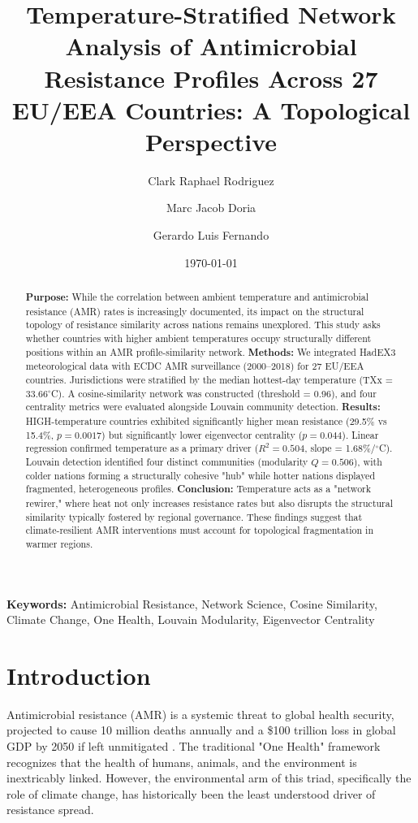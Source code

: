 \documentclass[11pt,a4paper]{article}
\title{\textbf{Temperature-Stratified Network Analysis of Antimicrobial Resistance Profiles Across 27 EU/EEA Countries: A Topological Perspective}}
\author[1]{Clark Raphael Rodriguez}
\author[1]{Marc Jacob Doria}
\author[1]{Gerardo Luis Fernando}
\affil[1]{Department of Physical Sciences and Mathematics, University of the Philippines-Manila, Manila, Philippines}
\date{\today}
\begin{document}
\maketitle

\begin{abstract}
\textbf{Purpose:} While the correlation between ambient temperature and antimicrobial resistance (AMR) rates is increasingly documented, its impact on the structural topology of resistance similarity across nations remains unexplored. This study asks whether countries with higher ambient temperatures occupy structurally different positions within an AMR profile-similarity network.
\textbf{Methods:} We integrated HadEX3 meteorological data with ECDC AMR surveillance (2000–2018) for 27 EU/EEA countries. Jurisdictions were stratified by the median hottest-day temperature (TXx = 33.66$^\circ$C). A cosine-similarity network was constructed (threshold = 0.96), and four centrality metrics were evaluated alongside Louvain community detection.
\textbf{Results:} HIGH-temperature countries exhibited significantly higher mean resistance (29.5\% vs 15.4\%, $p=0.0017$) but significantly lower eigenvector centrality ($p=0.044$). Linear regression confirmed temperature as a primary driver ($R^2 = 0.504$, slope = 1.68\%/$^\circ$C). Louvain detection identified four distinct communities (modularity $Q=0.506$), with colder nations forming a structurally cohesive "hub" while hotter nations displayed fragmented, heterogeneous profiles.
\textbf{Conclusion:} Temperature acts as a "network rewirer," where heat not only increases resistance rates but also disrupts the structural similarity typically fostered by regional governance. These findings suggest that climate-resilient AMR interventions must account for topological fragmentation in warmer regions.
\end{abstract}

\textbf{Keywords:} Antimicrobial Resistance, Network Science, Cosine Similarity, Climate Change, One Health, Louvain Modularity, Eigenvector Centrality

\section{Introduction}\label{intro}
Antimicrobial resistance (AMR) is a systemic threat to global health security, projected to cause 10 million deaths annually and a \$100 trillion loss in global GDP by 2050 if left unmitigated \cite{murray2022global}. The traditional "One Health" framework recognizes that the health of humans, animals, and the environment is inextricably linked. However, the environmental arm of this triad, specifically the role of climate change, has historically been the least understood driver of resistance spread.
\end{document}
